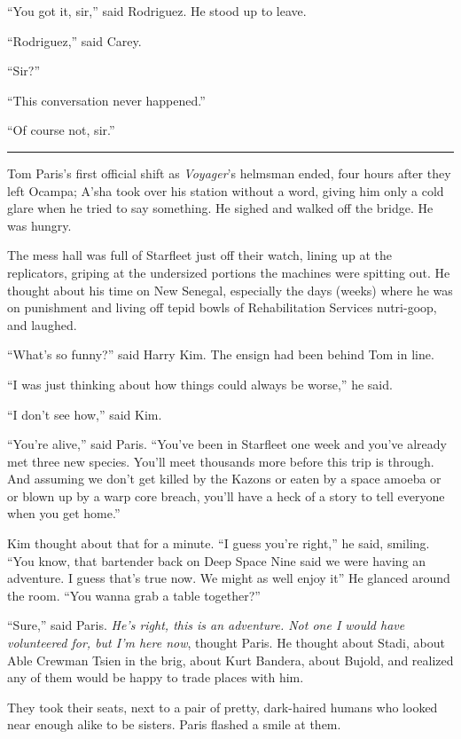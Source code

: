 \documentclass[twoside,letterpaper,12pt]{memoir}
\begin{document}
``You got it, sir,” said Rodriguez. He stood up to leave. 

``Rodriguez,” said Carey. 

``Sir?” 

``This conversation never happened.” 

``Of course not, sir.” 

\begin{center}\rule{3cm}{0.4 pt}\end{center} 

Tom Paris’s first official shift as \textit{Voyager}’s helmsman ended, four hours after they left Ocampa; A’sha took over his station without a word, giving him only a cold glare when he tried to say something. He sighed and walked off the bridge. He was hungry. 

The mess hall was full of Starfleet just off their watch, lining up at the replicators, griping at the undersized portions the machines were spitting out. He thought about his time on New Senegal, especially the days (weeks) where he was on punishment and living off tepid bowls of Rehabilitation Services nutri-goop, and laughed. 

``What’s so funny?” said Harry Kim. The ensign had been behind Tom in line. 

``I was just thinking about how things could always be worse,” he said. 

``I don’t see how,” said Kim. 

``You’re alive,” said Paris. ``You’ve been in Starfleet one week and you’ve already met three new species. You’ll meet thousands more before this trip is through. And assuming we don’t get killed by the Kazons or eaten by a space amoeba or or blown up by a warp core breach, you’ll have a heck of a story to tell everyone when you get home.” 

Kim thought about that for a minute. ``I guess you’re right,” he said, smiling. ``You know, that bartender back on Deep Space Nine said we were having an adventure. I guess that’s true now. We might as well enjoy it” He glanced around the room. ``You wanna grab a table together?” 

``Sure,” said Paris. \textit{He’s right, this is an adventure. Not one I would have volunteered for, but I’m here now}, thought Paris. He thought about Stadi, about Able Crewman Tsien in the brig, about Kurt Bandera, about Bujold, and realized any of them would be happy to trade places with him. 

They took their seats, next to a pair of pretty, dark-haired humans who looked near enough alike to be sisters. Paris flashed a smile at them. 
\end{document}
